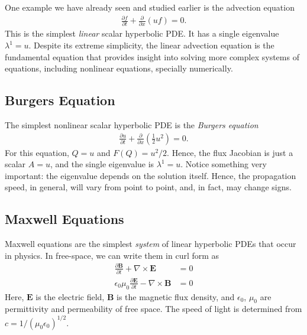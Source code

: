 \documentclass[12pt]{article}
\theoremstyle{definition}
\theoremstyle{definition}
\theoremstyle{definition}
\newcommand{\pfrac}[2]{\frac{\partial #1}{\partial #2}}
\newcommand{\pfraca}[1]{\frac{\partial}{\partial #1}}
\begin{document}
One example we have already seen and studied earlier is the advection
equation
\begin{align}
  \pfrac{f}{t} + \pfraca{x}(u f) = 0.
\end{align}
This is the simplest \emph{linear} scalar hyperbolic PDE. It has a
single eigenvalue $\lambda^1 = u$. Despite its extreme simplicity, the
linear advection equation is the fundamental equation that provides
insight into solving more complex systems of equations, including
nonlinear equations, specially numerically.

\subsection{Burgers Equation}

The simplest nonlinear scalar hyperbolic PDE is the \emph{Burgers
  equation}
\begin{align}
  \pfrac{u}{t} + \pfraca{x} \left(\frac{1}{2} u^2 \right) = 0.
\end{align}
For this equation, $Q = u$ and $F(Q) = u^2/2$. Hence, the flux
Jacobian is just a scalar $A = u$, and the single eigenvalue is
$\lambda^1 = u$. Notice something very important: the eigenvalue
depends on the solution itself. Hence, the propagation speed, in
general, will vary from point to point, and, in fact, may change
signs.

\subsection{Maxwell Equations}

Maxwell equations are the simplest \emph{system} of linear hyperbolic
PDEs that occur in physics. In free-space, we can write them in curl
form as
\begin{align}
  \frac{\partial \mathbf{B}}{\partial t} + \nabla\times\mathbf{E} &= 0 \\
  \epsilon_0\mu_0\frac{\partial \mathbf{E}}{\partial t} -
  \nabla\times\mathbf{B} &= 0
\end{align}
Here, $\mathbf{E}$ is the electric field, $\mathbf{B}$ is the magnetic
flux density, and $\epsilon_0$, $\mu_0$ are permittivity and
permeability of free space. The speed of light is determined from
$c=1/(\mu_0\epsilon_0)^{1/2}$.
\end{document}
